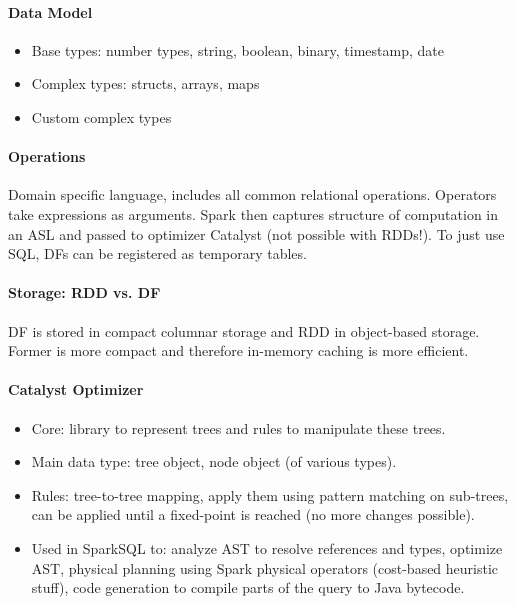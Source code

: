 \paragraph{Data Model}
\begin{itemize}
    \item Base types: number types, string, boolean, binary, timestamp, date
    \item Complex types: structs, arrays, maps
    \item Custom complex types
\end{itemize} %

\paragraph{Operations}
Domain specific language, includes all common relational operations. Operators take expressions as arguments. Spark then captures structure of computation in an ASL and passed to optimizer Catalyst (not possible with RDDs!). To just use SQL, DFs can be registered as temporary tables.

\paragraph{Storage: RDD vs. DF}
DF is stored in compact columnar storage and RDD in object-based storage. Former is more compact and therefore in-memory caching is more efficient.

\paragraph{Catalyst Optimizer}
\begin{itemize}
    \item Core: library to represent trees and rules to manipulate these trees.
    \item Main data type: tree object, node object (of various types).
    \item Rules: tree-to-tree mapping, apply them using pattern matching on sub-trees, can be applied until a fixed-point is reached (no more changes possible).
    \item Used in SparkSQL to: analyze AST to resolve references and types, optimize AST, physical planning using Spark physical operators (cost-based heuristic stuff), code generation to compile parts of the query to Java bytecode.
\end{itemize}

